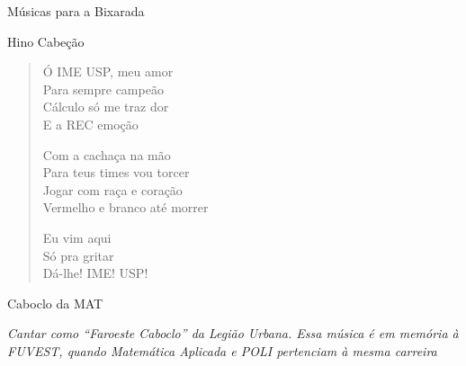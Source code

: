 \begin{secao}{Músicas para a Bixarada}

\begin{subsecao}{Hino Cabeção}
\begin{verse}

Ó IME USP, meu amor\\
Para sempre campeão\\
Cálculo só me traz dor\\
E a REC emoção

Com a cachaça na mão\\
Para teus times vou torcer\\
Jogar com raça e coração\\
Vermelho e branco até morrer

Eu vim aqui\\
Só pra gritar\\
Dá-lhe! IME! USP!
\end{verse}
\end{subsecao}

\begin{subsecao}{Caboclo da MAT}

{\em Cantar como ``Faroeste Caboclo'' da Legião Urbana. Essa música é em memória 
à FUVEST, quando Matemática Aplicada e POLI pertenciam à mesma carreira}


\end{subsecao}
\end{secao}
